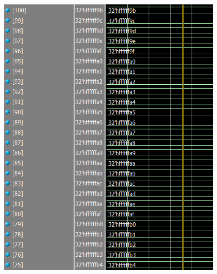 \documentclass[conference]{IEEEtran}
\begin{document}
	\begin{figure}[H]
		\centering
		\includegraphics[width=\columnwidth]{Files/full_mem_val6}
		\caption{}
		\label{fig:fullmemval6}
	\end{figure}
	
\end{document}
